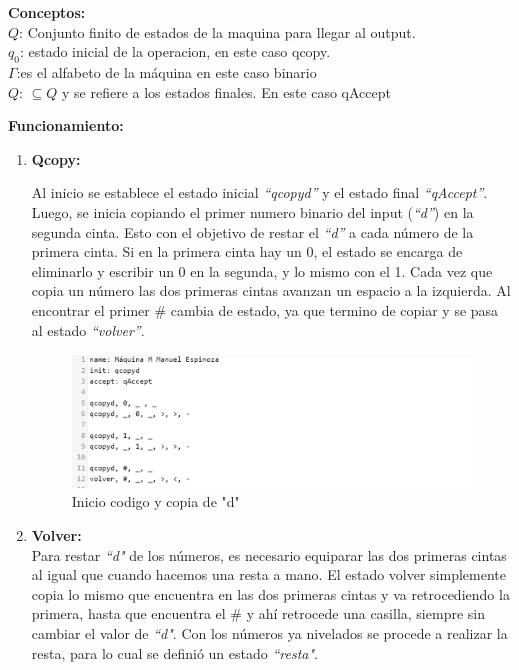 \documentclass[12pt]{article}
\begin{document}
\textbf{Conceptos:}\\

$Q$: Conjunto finito de estados de la maquina para llegar al output.\\
$q_0$: estado inicial de la operacion, en este caso qcopy.\\
$\Gamma$:es el alfabeto de la máquina en este caso binario\\
$Q$: $\subseteq Q$ y se refiere a los estados finales. En este caso qAccept

\newpage
\textbf{Funcionamiento:}\\

\begin{enumerate}
\item \textbf{Qcopy:}

Al inicio se establece el estado inicial \textit{“qcopyd”} y el estado final \textit{“qAccept”}. Luego, se inicia copiando el primer numero binario del input (\textit{“d”}) en la segunda cinta. Esto con el objetivo de restar el \textit{“d”} a cada número de la primera cinta. Si en la primera cinta hay un 0, el estado se encarga de eliminarlo y escribir un 0 en la segunda, y lo mismo con el 1. Cada vez que copia un número las dos primeras cintas avanzan un espacio a la izquierda. Al encontrar el primer \# cambia de estado, ya que termino de copiar y se pasa al estado \textit{“volver”}.\par

\begin{figure}[h]
    \centering
    \includegraphics[width=\textwidth]{fotos/Screenshot 2021-11-26 173352.png}
    \caption{Inicio codigo y copia de "d"}
\end{figure}

\newpage
\item \textbf{Volver:}\\

Para restar \textit{“d"} de los números, es necesario equiparar las dos primeras cintas al igual que cuando hacemos una resta a mano. El estado volver simplemente copia lo mismo que encuentra en las dos primeras cintas y va retrocediendo la primera, hasta que encuentra el \# y ahí retrocede una casilla, siempre sin cambiar el valor de \textit{“d"}. Con los números ya nivelados se procede a realizar la resta, para lo cual se definió un estado \textit{“resta"}.



\end{enumerate}
\end{document}

